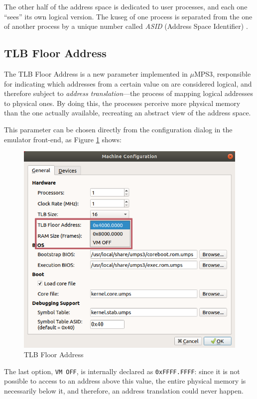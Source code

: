 \documentclass[12pt,a4paper,openright,twoside]{report}
\begin{document}
The other half of the address space is dedicated to user processes, and each one ``sees'' its own logical version.
The kuseg of one process is separated from the one of another process by a unique number called \textit{ASID} (Address Space Identifier) \cite{pops}.

\subsection{TLB Floor Address}
\label{chap:tlb_floor_address}
The TLB Floor Address is a new parameter implemented in $\mu$MPS3, responsible for indicating which addresses from a certain value on are considered logical, and therefore subject to \textit{address translation}---the process of mapping logical addresses to physical ones.
By doing this, the processes perceive more physical memory than the one actually available, recreating an abstract view of the address space.

This parameter can be chosen directly from the configuration dialog in the emulator front-end, as Figure \ref{fig:tlb_floor_address} shows:
\begin{figure}[h]
	\centering
	\includegraphics[scale=0.68]{tlb_floor_address}
	\caption{TLB Floor Address}
	\label{fig:tlb_floor_address}
\end{figure}

The last option, \texttt{VM OFF}, is internally declared as \texttt{0xFFFF.FFFF}: since it is not possible to access to an address above this value, the entire physical memory is necessarily below it, and therefore, an address translation could never happen.
\end{document}
